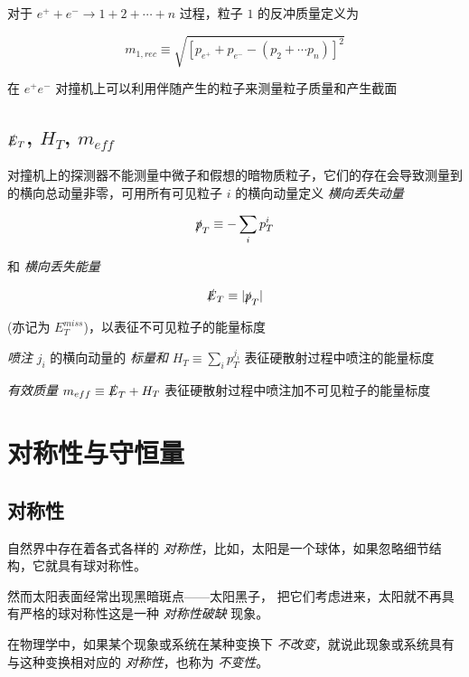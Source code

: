 \documentclass[oneside,a4paper,openany,11pt]{ctexbook}
\begin{document}
对于 $e^+ + e^- \to 1 + 2 + \cdots + n$ 过程，粒子 $1$ 的反冲质量定义为

\begin{equation}
    m_{1, rec} \equiv \sqrt{[p_{e^+} + p_{e^-} - (p_2 + \cdots p_n)]^2}
\end{equation}

在 $e^+ e^-$ 对撞机上可以利用伴随产生的粒子来测量粒子质量和产生截面

\subsection{\texorpdfstring{$\slashed{E}_T$}{ET}, \texorpdfstring{$H_T$}{HT}, \texorpdfstring{$m_{eff}$}{meff}}

对撞机上的探测器不能测量中微子和假想的暗物质粒子，它们的存在会导致测量到的横向总动量非零，可用所有可见粒子 $i$ 的横向动量定义 \emph{横向丢失动量}

\begin{equation}
    \slashed{p}_T \equiv -\sum_i p^i_T
\end{equation}

和 \emph{横向丢失能量}

\begin{equation}
    \slashed{E}_T \equiv |\slashed{p}_T|
\end{equation}

(亦记为 $E^{miss}_T$)，以表征不可见粒子的能量标度

\emph{喷注} $j_i$ 的横向动量的 \emph{标量和} $H_T \equiv \sum_i p^{j_i}_T$ 表征硬散射过程中喷注的能量标度

\emph{有效质量} $m_{eff} \equiv \slashed{E}_T + H_T$ 表征硬散射过程中喷注加不可见粒子的能量标度

\section{对称性与守恒量}

\subsection{对称性}

自然界中存在着各式各样的 \emph{对称性}，比如，太阳是一个球体，如果忽略细节结构，它就具有球对称性。

然而太阳表面经常出现黑暗斑点——太阳黑子， 把它们考虑进来，太阳就不再具有严格的球对称性这是一种 \emph{对称性破缺} 现象。

在物理学中，如果某个现象或系统在某种变换下 \emph{不改变}，就说此现象或系统具有
与这种变换相对应的 \emph{对称性}，也称为 \emph{不变性}。
\end{document}
